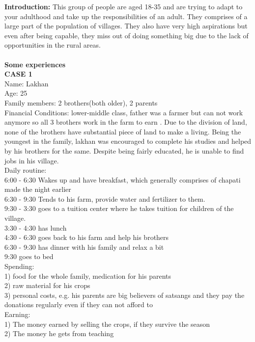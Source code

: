 \documentclass{article}
\begin{document}
\textbf{Introduction:} This group of people are aged 18-35 and are trying to adapt to your adulthood and take up the responsibilities of an adult. They comprises of a large part of the population of villages. They also have very high aspirations but even after being capable, they miss out of doing something big due to the lack of opportunities in the rural areas. \\\\
\textbf{Some experiences}\\
\textbf{CASE 1}\\
Name: Lakhan \\
Age: 25\\
Family members: 2 brothers(both older), 2 parents\\
Financial Conditions: lower-middle class, father was a farmer but can not work anymore so all 3 brothers work in the farm to earn . Due to the division of land, none of the brothers have substantial piece of land to make a living. Being the youngest in the family, lakhan was encouraged to complete his studies and helped by his brothers for the same. Despite being fairly educated, he is unable to find jobs in his village.\\
Daily routine:\\ 
6:00 - 6:30 Wakes up and have breakfast, which generally comprises of chapati made the night earlier\\
6:30 - 9:30 Tends to his farm, provide water and fertilizer to them.\\
9:30 - 3:30 goes to a tuition center where he takes tuition for children of the village.\\
3:30 - 4:30 has lunch\\
4:30 - 6:30 goes back to his farm and help his brothers\\
6:30 - 9:30 has dinner with his family and relax a bit\\
9:30 goes to bed\\
Spending: \\
1) food for the whole family, medication for his parents\\
2) raw material for his crops\\
3) personal costs, e.g. his parents are big believers of satsangs and they pay the donations regularly even if they can not afford to\\
Earning:\\
1) The money earned by selling the crops, if they survive the season\\
2) The money he gets from teaching\\
\end{document}
